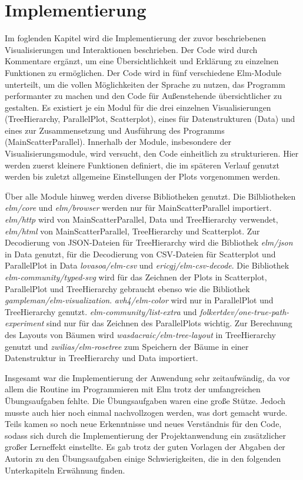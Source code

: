 \documentclass[usegeometry=true]{scrartcl}
\begin{document}
\section{Implementierung}
Im foglenden Kapitel wird die Implementierung der zuvor beschriebenen Visualisierungen und Interaktionen beschrieben. Der Code wird durch Kommentare ergänzt, um eine Übersichtlichkeit und Erklärung zu einzelnen Funktionen zu ermöglichen.
Der Code wird in fünf verschiedene Elm-Module unterteilt, um die vollen Möglichkeiten der Sprache zu nutzen, das Programm performanter zu machen und den Code für Außenstehende übersichtlicher zu gestalten.
Es existiert je ein Modul für die drei einzelnen Visualisierungen (TreeHierarchy, ParallelPlot, Scatterplot), eines für Datenstrukturen (Data) und eines zur Zusammensetzung und Ausführung des Programms (MainScatterParallel). 
Innerhalb der Module, insbesondere der Visualisierungsmodule, wird versucht, den Code einheitlich zu strukturieren. 
Hier werden zuerst kleinere Funktionen definiert, die im späteren Verlauf genutzt werden bis zuletzt allgemeine Einstellungen der Plots vorgenommen werden. 

Über alle Module hinweg werden diverse Bibliotheken genutzt. Die Bilbliotheken \textit{elm/core} und \textit{elm/browser} werden nur für MainScatterParallel importiert. 
\textit{elm/http} wird von MainScatterParallel, Data und TreeHierarchy verwendet, \textit{elm/html} von MainScatterParallel, TreeHierarchy und Scatterplot.
Zur Decodierung von JSON-Dateien für TreeHierarchy wird die Bibliothek \textit{elm/json} in Data genutzt, für die Decodierung von CSV-Dateien für Scatterplot und ParallelPlot in Data \textit{lovasoa/elm-csv} und \textit{ericgj/elm-csv-decode}.
Die Bibliothek \textit{elm-community/typed-svg} wird für das Zeichnen der Plots in Scatterplot, ParallelPlot und TreeHierarchy gebraucht ebenso wie die Bibliothek \textit{gampleman/elm-visualization}. 
\textit{avh4/elm-color} wird nur in ParallelPlot und TreeHierarchy genutzt. 
\textit{elm-community/list-extra} und \textit{folkertdev/one-true-path-experiment} sind nur für das Zeichnen des ParallelPlots wichtig.
Zur Berechnung des Layouts von Bäumen wird \textit{wasdacraic/elm-tree-layout} in TreeHierarchy genutzt und \textit{zwilias/elm-rosetree} zum Speichern der Bäume in einer Datenstruktur in TreeHierarchy und Data importiert.
           
Insgesamt war die Implementierung der Anwendung sehr zeitaufwändig, da vor allem die Routine im Programmieren mit Elm trotz der umfangreichen Übungsaufgaben fehlte.
Die Übungsaufgaben waren eine große Stütze. Jedoch musste auch hier noch einmal nachvollzogen werden, was dort gemacht wurde. Teils kamen so noch neue Erkenntnisse und neues Verständnis für den Code, sodass sich durch die Implementierung der Projektanwendung ein zusätzlicher großer Lerneffekt einstellte.
Es gab trotz der guten Vorlagen der Abgaben der Autorin zu den Übungsaufgaben einige Schwierigkeiten, die in den folgenden Unterkapiteln Erwähnung finden.
          
\end{document}
